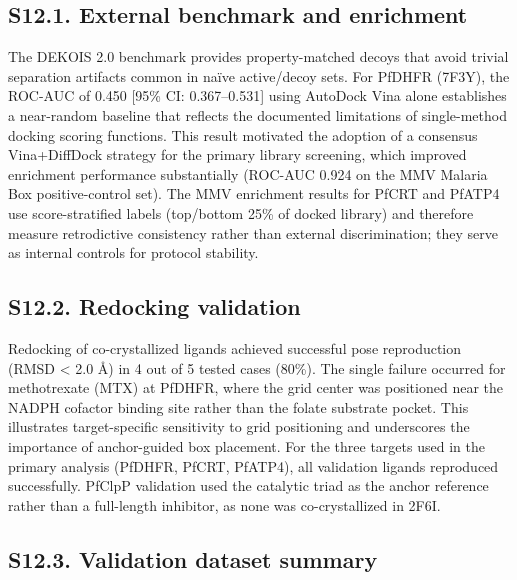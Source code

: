 \documentclass[journal=jcisd8,manuscript=suppinfo]{achemso}
\begin{document}
\subsection*{S12.1. External benchmark and enrichment}


The DEKOIS 2.0 benchmark \cite{Bauer2013} provides property-matched decoys that avoid trivial separation artifacts common in na\"ive active/decoy sets. For PfDHFR (7F3Y), the ROC-AUC of 0.450 [95\% CI: 0.367--0.531] using AutoDock Vina alone establishes a near-random baseline that reflects the documented limitations of single-method docking scoring functions. This result motivated the adoption of a consensus Vina+DiffDock strategy for the primary library screening, which improved enrichment performance substantially (ROC-AUC 0.924 on the MMV Malaria Box positive-control set). The MMV enrichment results for PfCRT and PfATP4 use score-stratified labels (top/bottom 25\% of docked library) and therefore measure retrodictive consistency rather than external discrimination; they serve as internal controls for protocol stability.

\subsection*{S12.2. Redocking validation}


Redocking of co-crystallized ligands achieved successful pose reproduction (RMSD < 2.0 \si{\angstrom}) in 4 out of 5 tested cases (80\%). The single failure occurred for methotrexate (MTX) at PfDHFR, where the grid center was positioned near the NADPH cofactor binding site rather than the folate substrate pocket. This illustrates target-specific sensitivity to grid positioning and underscores the importance of anchor-guided box placement. For the three targets used in the primary analysis (PfDHFR, PfCRT, PfATP4), all validation ligands reproduced successfully. PfClpP validation used the catalytic triad as the anchor reference rather than a full-length inhibitor, as none was co-crystallized in 2F6I.

\subsection*{S12.3. Validation dataset summary}

\end{document}
